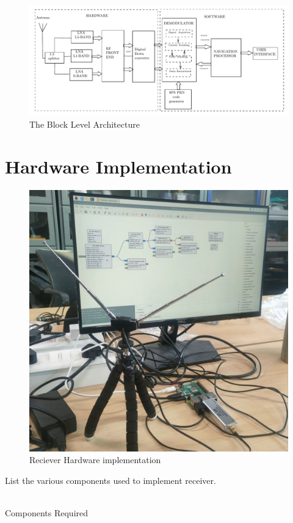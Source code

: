 \begin{figure}
\includegraphics[scale=0.5]{figs/block1}
\caption{The Block Level Architecture}
\label{fig:Block-diagram}
\end{figure}
\section{Hardware Implementation}
\begin{figure}
\includegraphics[scale=0.2]{figs/hardwareimplement.jpg} 
\caption{Reciever Hardware implementation}
\label{fig:rtl-sdr}
\end{figure}
List the various components used to implement receiver.
\\
\solution
\\
\begin{table}[!ht]
  \centering
 
  \caption{Components Required}
  \label{tab:rxcomponents}
\end{table}
